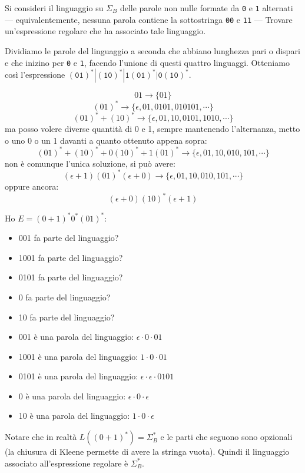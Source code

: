 \begin{example}\label{exa:01}
Si consideri il linguaggio su $\Sigma_{B}$ delle parole non nulle formate da  \texttt{0} e \texttt{1} alternati --- equivalentemente, nessuna
parola contiene la sottostringa  \texttt{00} e \texttt{11} ---
Trovare un'espressione regolare che ha associato tale linguaggio.

Dividiamo le parole del linguaggio a seconda che abbiano lunghezza pari o dispari e che inizino per \texttt{0} e
\texttt{1}, facendo l'unione di questi quattro linguaggi.
Otteniamo così l'espressione $(\mathtt{01})^* | (\mathtt{10})^* | \mathtt{1}(\mathtt{01})^* | \mathtt{0}(\mathtt{10})^*$.

		\[01\to \{01\}\]
		$$(01)^*\to \{\epsilon, 01, 0101,010101,\cdots\}$$
		$$(01)^{*} + (10)^{*} \to \{ \epsilon, 01,10,0101,1010, \cdots \} $$
		ma posso volere diverse quantità di 0 e 1, sempre mantenendo l'alternanza, metto o uno 0 o un 1 davanti a quanto ottenuto appena sopra:
		$$(01)^*+(10)^*+0(10)^*+1(01)^*\to \{\epsilon,01,10,010,101,\cdots\}$$
		non è comunque l'unica soluzione, si può avere:
		$$(\epsilon+1)(01)^*(\epsilon+0)\to \{\epsilon,01,10,010,101,\cdots\}$$
		oppure ancora:
		$$(\epsilon+0)(10)^*(\epsilon+1)$$
\end{example}


\begin{Exercise}[label=3-1]
Ho $E=(0+1)^*0^*(01)^*$:
\begin{itemize}
\item 001 fa parte del linguaggio?
\item 1001 fa parte del linguaggio?
\item 0101 fa parte del linguaggio?
\item 0 fa parte del linguaggio?
\item 10 fa parte del linguaggio?
\end{itemize}
\end{Exercise}


\begin{Answer}
\begin{itemize}
\item 001 è una parola del linguaggio: $\epsilon\cdot 0\cdot 01$
\item 1001 è una parola del linguaggio: $1\cdot 0\cdot 01$
\item 0101 è una parola del linguaggio: $\epsilon\cdot\epsilon \cdot 0101$
\item 0 è una parola del linguaggio: $\epsilon\cdot 0\cdot \epsilon$
\item 10 è una parola del linguaggio: $1\cdot 0\cdot \epsilon$
\end{itemize}



Notare che in realtà $L((0+1)^*)= \Sigma_{B}^*$ e le parti che seguono sono opzionali (la chiusura di Kleene permette di
avere la stringa vuota).
Quindi il linguaggio associato all'espressione regolare è $\Sigma_{B}^*$.
\end{Answer}

